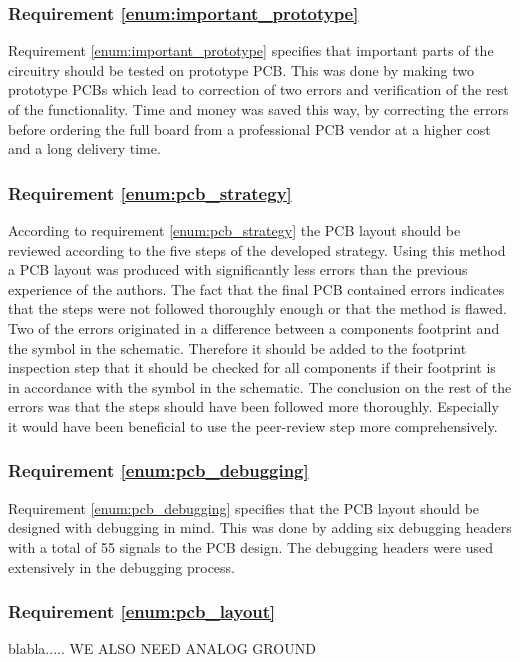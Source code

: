 \subsubsection{Requirement \ref{enum:important_prototype}} %
\label{ssub:requirement_enum:important_prototype}
Requirement \ref{enum:important_prototype} specifies that important parts of the circuitry should be tested on prototype PCB.
This was done by making two prototype PCBs which lead to correction of two errors and verification of the rest of the functionality.
Time and money was saved this way, by correcting the errors before ordering the full board from a professional PCB vendor at a higher cost and a long delivery time.


\subsubsection{Requirement \ref{enum:pcb_strategy}} %
\label{ssub:requirement_enum:pcb_strategy}
According to requirement \ref{enum:pcb_strategy} the PCB layout should be reviewed according to the five steps of the developed strategy.
Using this method a PCB layout was produced with significantly less errors than the previous experience of the authors.
The fact that the final PCB contained errors indicates that the steps were not followed thoroughly enough or that the method is flawed.
Two of the errors originated in a difference between a components footprint and the symbol in the schematic.
Therefore it should be added to the footprint inspection step that it should be checked for all components if their footprint is in accordance with the symbol in the schematic.
The conclusion on the rest of the errors was that the steps should have been followed more thoroughly.
Especially it would have been beneficial to use the peer-review step more comprehensively.

\subsubsection{Requirement \ref{enum:pcb_debugging}} %
\label{ssub:requirement_enum:pcb_debugging}
Requirement \ref{enum:pcb_debugging} specifies that the PCB layout should be designed with debugging in mind.
This was done by adding six debugging headers with a total of 55 signals to the PCB design.
The debugging headers were used extensively in the debugging process.

\subsubsection{Requirement \ref{enum:pcb_layout}} %
\label{ssub:requirement_enum:pcb_layout}
blabla.....
WE ALSO NEED ANALOG GROUND

